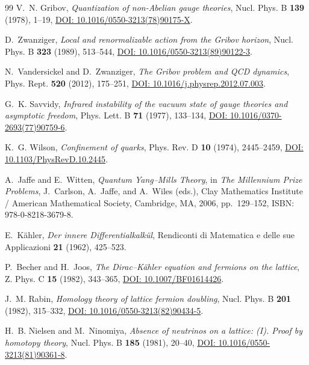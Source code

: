 \documentclass[11pt,a4paper,reqno]{amsart}
\theoremstyle{definition}
\numberwithin{equation}{section}
\begin{document}
\begin{thebibliography}{99}
V.~N. Gribov,
\emph{Quantization of non-Abelian gauge theories},
Nucl. Phys. B \textbf{139} (1978), 1--19, \href{https://doi.org/10.1016/0550-3213(78)90175-X}{DOI: 10.1016/0550-3213(78)90175-X}.

D.~Zwanziger,
\emph{Local and renormalizable action from the Gribov horizon},
Nucl. Phys. B \textbf{323} (1989), 513--544, \href{https://doi.org/10.1016/0550-3213(89)90122-3}{DOI: 10.1016/0550-3213(89)90122-3}.

N.~Vandersickel and D.~Zwanziger,
\emph{The Gribov problem and QCD dynamics},
Phys. Rept. \textbf{520} (2012), 175--251, \href{https://doi.org/10.1016/j.physrep.2012.07.003}{DOI: 10.1016/j.physrep.2012.07.003}.

G.~K. Savvidy,
\emph{Infrared instability of the vacuum state of gauge theories and asymptotic freedom},
Phys. Lett. B \textbf{71} (1977), 133--134, \href{https://doi.org/10.1016/0370-2693(77)90759-6}{DOI: 10.1016/0370-2693(77)90759-6}.

K.~G. Wilson,
\emph{Confinement of quarks},
Phys. Rev. D \textbf{10} (1974), 2445--2459, \href{https://doi.org/10.1103/PhysRevD.10.2445}{DOI: 10.1103/PhysRevD.10.2445}.

A.~Jaffe and E.~Witten,
\emph{Quantum Yang--Mills Theory},
in \emph{The Millennium Prize Problems}, J.~Carlson, A.~Jaffe, and A.~Wiles (eds.), Clay Mathematics Institute / American Mathematical Society, Cambridge, MA, 2006, pp.~129--152, ISBN: 978-0-8218-3679-8.

E.~K{\"a}hler,
\emph{Der innere Differentialkalk{\"u}l},
Rendiconti di Matematica e delle sue Applicazioni \textbf{21} (1962), 425--523.

P.~Becher and H.~Joos,
\emph{The Dirac--K{\"a}hler equation and fermions on the lattice},
Z. Phys. C \textbf{15} (1982), 343--365, \href{https://doi.org/10.1007/BF01614426}{DOI: 10.1007/BF01614426}.

J.~M. Rabin,
\emph{Homology theory of lattice fermion doubling},
Nucl. Phys. B \textbf{201} (1982), 315--332, \href{https://doi.org/10.1016/0550-3213(82)90434-5}{DOI: 10.1016/0550-3213(82)90434-5}.

H.~B. Nielsen and M.~Ninomiya,
\emph{Absence of neutrinos on a lattice: (I). Proof by homotopy theory},
Nucl. Phys. B \textbf{185} (1981), 20--40, \href{https://doi.org/10.1016/0550-3213(81)90361-8}{DOI: 10.1016/0550-3213(81)90361-8}.


\end{thebibliography}
\end{document}

